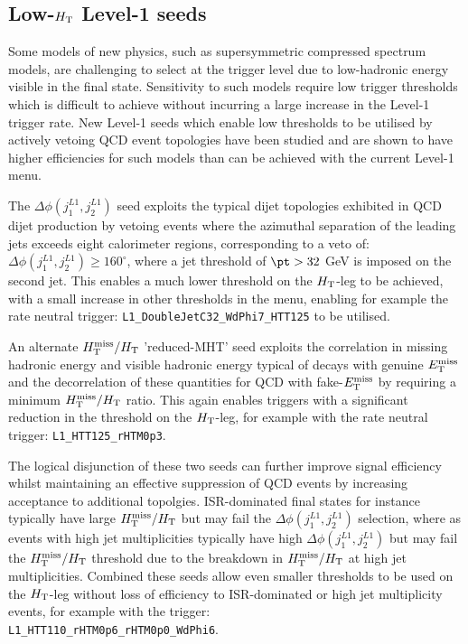 \subsection{Low-$\mbox{$H_\text{T}$}$ Level-1 seeds}

Some models of new physics, such as supersymmetric compressed spectrum models, are challenging to select at the trigger level due to low-hadronic energy visible in the final state. Sensitivity to such models require low trigger thresholds which is difficult to achieve without incurring a large increase in the Level-1 trigger rate. New Level-1 seeds which enable low thresholds to be utilised by actively vetoing QCD event topologies have been studied and are shown to have higher efficiencies for such models than can be achieved with the current Level-1 menu.

The $\Delta\phi(j_{1}^{L1},j_{2}^{L1})$ seed exploits the typical dijet topologies exhibited in QCD dijet production by vetoing events where the azimuthal separation of the leading jets exceeds eight calorimeter regions, corresponding to a veto of: $\Delta\phi(j_{1}^{L1},j_{2}^{L1}) \ge 160^{\circ}$, where a jet threshold of $\pt > 32$ GeV is imposed on the second jet. This enables a much lower threshold on the $\mbox{$H_\text{T}$}$-leg to be achieved, with a small increase in other thresholds in the menu, enabling for example the rate neutral trigger: \verb!L1_DoubleJetC32_WdPhi7_HTT125! to be utilised.

An alternate $\mbox{$H_{\rm T}^{\rm miss}$}/\mbox{$H_\text{T}$}$ 'reduced-MHT' seed exploits the correlation in missing hadronic energy and visible hadronic energy typical of decays with genuine $\mbox{$E_\text{T}^{\rm miss}$}$ and the decorrelation of these quantities for QCD with fake-$\mbox{$E_\text{T}^{\rm miss}$}$ by requiring a minimum $\mbox{$H_{\rm T}^{\rm miss}$}/\mbox{$H_\text{T}$}$ ratio. This again enables triggers with a significant reduction in the threshold on the $\mbox{$H_\text{T}$}$-leg, for example with the rate neutral trigger: \verb!L1_HTT125_rHTM0p3!.

The logical disjunction of these two seeds can further improve signal efficiency whilst maintaining an effective suppression of QCD events by increasing acceptance to additional topolgies. ISR-dominated final states for instance typically have large $\mbox{$H_{\rm T}^{\rm miss}$}/\mbox{$H_\text{T}$}$ but may fail the $\Delta\phi(j_{1}^{L1},j_{2}^{L1})$ selection, where as events with high jet multiplicities typically have high $\Delta\phi(j_{1}^{L1},j_{2}^{L1})$ but may fail the $\mbox{$H_{\rm T}^{\rm miss}$}/\mbox{$H_\text{T}$}$ threshold due to the breakdown in $\mbox{$H_{\rm T}^{\rm miss}$}/\mbox{$H_\text{T}$}$ at high jet multiplicities. Combined these seeds allow even smaller thresholds to be used on the $\mbox{$H_\text{T}$}$-leg without loss of efficiency to ISR-dominated or high jet multiplicity events, for example with the trigger:\\ \verb!L1_HTT110_rHTM0p6_rHTM0p0_WdPhi6!.


